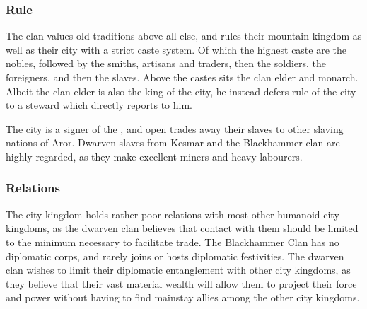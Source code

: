 \subsubsection{Rule}

The clan values old traditions above all else, and rules their mountain
kingdom as well as their city with a strict caste system. Of which the highest
caste are the nobles, followed by the smiths, artisans and traders, then the
soldiers, the foreigners, and then the slaves. Above the castes sits the clan
elder and monarch. Albeit the clan elder is also the king of the city, he
instead defers rule of the city to a steward which directly reports to him.

The city is a signer of the , and open trades away
their slaves to other slaving nations of Aror. Dwarven slaves from Kesmar and
the Blackhammer clan are highly regarded, as they make excellent miners and
heavy labourers.

\subsubsection{Relations}

The city kingdom holds rather poor relations with most other humanoid city
kingdoms, as the dwarven clan believes that contact with them should be limited
to the minimum necessary to facilitate trade. The Blackhammer Clan has no
diplomatic corps, and rarely joins or hosts diplomatic festivities. The
dwarven clan wishes to limit their diplomatic entanglement with other city
kingdoms, as they believe that their vast material wealth will allow them to
project their force and power without having to find mainstay allies among the
other city kingdoms.

